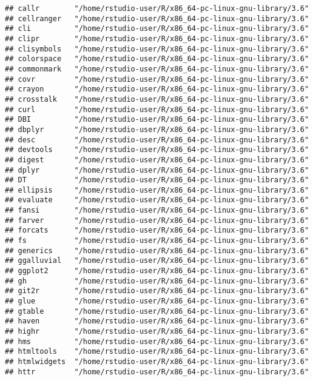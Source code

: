 \documentclass[]{book}
\begin{document}
\begin{verbatim}
## callr        "/home/rstudio-user/R/x86_64-pc-linux-gnu-library/3.6"
## cellranger   "/home/rstudio-user/R/x86_64-pc-linux-gnu-library/3.6"
## cli          "/home/rstudio-user/R/x86_64-pc-linux-gnu-library/3.6"
## clipr        "/home/rstudio-user/R/x86_64-pc-linux-gnu-library/3.6"
## clisymbols   "/home/rstudio-user/R/x86_64-pc-linux-gnu-library/3.6"
## colorspace   "/home/rstudio-user/R/x86_64-pc-linux-gnu-library/3.6"
## commonmark   "/home/rstudio-user/R/x86_64-pc-linux-gnu-library/3.6"
## covr         "/home/rstudio-user/R/x86_64-pc-linux-gnu-library/3.6"
## crayon       "/home/rstudio-user/R/x86_64-pc-linux-gnu-library/3.6"
## crosstalk    "/home/rstudio-user/R/x86_64-pc-linux-gnu-library/3.6"
## curl         "/home/rstudio-user/R/x86_64-pc-linux-gnu-library/3.6"
## DBI          "/home/rstudio-user/R/x86_64-pc-linux-gnu-library/3.6"
## dbplyr       "/home/rstudio-user/R/x86_64-pc-linux-gnu-library/3.6"
## desc         "/home/rstudio-user/R/x86_64-pc-linux-gnu-library/3.6"
## devtools     "/home/rstudio-user/R/x86_64-pc-linux-gnu-library/3.6"
## digest       "/home/rstudio-user/R/x86_64-pc-linux-gnu-library/3.6"
## dplyr        "/home/rstudio-user/R/x86_64-pc-linux-gnu-library/3.6"
## DT           "/home/rstudio-user/R/x86_64-pc-linux-gnu-library/3.6"
## ellipsis     "/home/rstudio-user/R/x86_64-pc-linux-gnu-library/3.6"
## evaluate     "/home/rstudio-user/R/x86_64-pc-linux-gnu-library/3.6"
## fansi        "/home/rstudio-user/R/x86_64-pc-linux-gnu-library/3.6"
## farver       "/home/rstudio-user/R/x86_64-pc-linux-gnu-library/3.6"
## forcats      "/home/rstudio-user/R/x86_64-pc-linux-gnu-library/3.6"
## fs           "/home/rstudio-user/R/x86_64-pc-linux-gnu-library/3.6"
## generics     "/home/rstudio-user/R/x86_64-pc-linux-gnu-library/3.6"
## ggalluvial   "/home/rstudio-user/R/x86_64-pc-linux-gnu-library/3.6"
## ggplot2      "/home/rstudio-user/R/x86_64-pc-linux-gnu-library/3.6"
## gh           "/home/rstudio-user/R/x86_64-pc-linux-gnu-library/3.6"
## git2r        "/home/rstudio-user/R/x86_64-pc-linux-gnu-library/3.6"
## glue         "/home/rstudio-user/R/x86_64-pc-linux-gnu-library/3.6"
## gtable       "/home/rstudio-user/R/x86_64-pc-linux-gnu-library/3.6"
## haven        "/home/rstudio-user/R/x86_64-pc-linux-gnu-library/3.6"
## highr        "/home/rstudio-user/R/x86_64-pc-linux-gnu-library/3.6"
## hms          "/home/rstudio-user/R/x86_64-pc-linux-gnu-library/3.6"
## htmltools    "/home/rstudio-user/R/x86_64-pc-linux-gnu-library/3.6"
## htmlwidgets  "/home/rstudio-user/R/x86_64-pc-linux-gnu-library/3.6"
## httr         "/home/rstudio-user/R/x86_64-pc-linux-gnu-library/3.6"

\end{verbatim}
\end{document}
